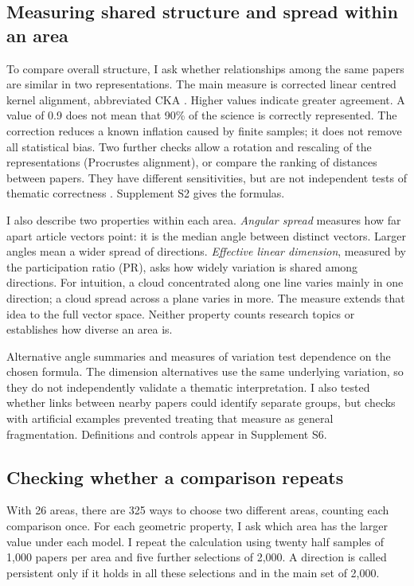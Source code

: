 \subsection{Measuring shared structure and spread within an area}
To compare overall structure, I ask whether relationships among the same papers are similar in two representations. The main measure is corrected linear centred kernel alignment, abbreviated CKA \citep{pmlr-v97-kornblith19a,refa961d84a4e}. Higher values indicate greater agreement. A value of 0.9 does not mean that 90\% of the science is correctly represented. The correction reduces a known inflation caused by finite samples; it does not remove all statistical bias. Two further checks allow a rotation and rescaling of the representations (Procrustes alignment), or compare the ranking of distances between papers. They have different sensitivities, but are not independent tests of thematic correctness \citep{NEURIPS2021_252a3dba,pmlr-v285-williams24a}. Supplement S2 gives the formulas.

I also describe two properties within each area. \emph{Angular spread} measures how far apart article vectors point: it is the median angle between distinct vectors. Larger angles mean a wider spread of directions. \emph{Effective linear dimension}, measured by the participation ratio (PR), asks how widely variation is shared among directions. For intuition, a cloud concentrated along one line varies mainly in one direction; a cloud spread across a plane varies in more. The measure extends that idea to the full vector space. Neither property counts research topics or establishes how diverse an area is.

Alternative angle summaries and measures of variation test dependence on the chosen formula. The dimension alternatives use the same underlying variation, so they do not independently validate a thematic interpretation. I also tested whether links between nearby papers could identify separate groups, but checks with artificial examples prevented treating that measure as general fragmentation. Definitions and controls appear in Supplement S6.

\subsection{Checking whether a comparison repeats}
With 26 areas, there are 325 ways to choose two different areas, counting each comparison once. For each geometric property, I ask which area has the larger value under each model. I repeat the calculation using twenty half samples of 1,000 papers per area and five further selections of 2,000. A direction is called persistent only if it holds in all these selections and in the main set of 2,000.

